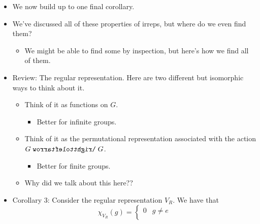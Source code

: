 \documentclass[../notes.tex]{subfiles}
\begin{document}
\begin{itemize}
\begin{proof}
        ($2\Rightarrow 1$): Complete reducibility implies that $V\cong V_1^{n_1}\oplus\cdots\oplus V_k^{n_k}$, where the $V_i$'s are irreps. This combined with the hypothesis implies that
        \begin{equation*}
            1 = \inp{\chi_V,\chi_V}
            = \inp{\sum_{i=1}^kn_i\chi_{V_i},\sum_{i=1}^kn_i\chi_{V_i}}
            = \sum_{i=1}^kn_i^2
        \end{equation*}
        But if $\sum n_i^2=1$ where each $n_i\in\Z^+$, then $n_i=1$ for some $i$ and $n_j=0$ for $j\neq i$, from which it follows that $V\cong V_i$.\par
        We can interconvert between 2 and 3 using the definition of the inner product and the property of complex numbers that $zz^*=|z|^2$.
    \end{proof}
    \item We now build up to one final corollary.
    \item We've discussed all of these properties of irreps, but where do we even find them?
    \begin{itemize}
        \item We might be able to find some by inspection, but here's how we find all of them.
    \end{itemize}
    \item Review: The regular representation. Here are two different but isomorphic ways to think about it.
    \begin{itemize}
        \item Think of it as functions on $G$.
        \begin{itemize}
            \item Better for infinite groups.
        \end{itemize}
        \item Think of it as the permutational representation associated with the action $G\acts G$.
        \begin{itemize}
            \item Better for finite groups.
        \end{itemize}
        \item Why did we talk about this here??
    \end{itemize}
    \item Corollary 3: Consider the regular representation $V_R$. We have that
    \begin{equation*}
        \chi_{V_R}(g) =
        \begin{cases}
            0 & g\neq e\\

\end{cases}
\end{equation*}
\end{itemize}
\end{document}
